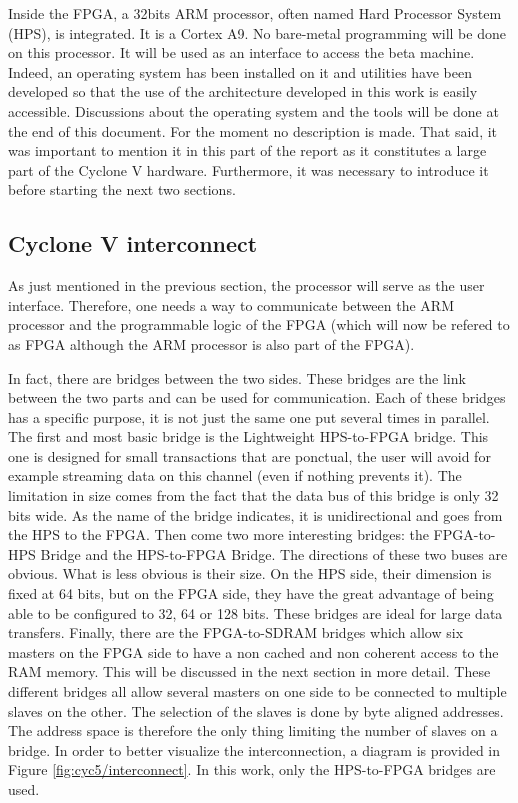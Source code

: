 Inside the FPGA, a 32bits ARM processor, often named Hard Processor System (HPS), is integrated. It is a Cortex A9. No bare-metal programming 
will be done on this processor. It will be used as an interface to access the beta machine. Indeed, 
an operating system has been installed on it and utilities have been developed so that the use of 
the architecture developed in this work is easily accessible. Discussions about the operating system 
and the tools will be done at the end of this document. For the moment no description is made. That 
said, it was important to mention it in this part of the report as it constitutes a large part of 
the Cyclone V hardware. Furthermore, it was necessary to introduce it before starting the next two 
sections.

\subsection{Cyclone V interconnect}

As just mentioned in the previous section, the processor will serve as the user interface. 
Therefore, one needs a way to communicate between the ARM processor and the programmable logic of the 
FPGA (which will now be refered to as FPGA although the ARM processor is also part of the FPGA). 

In fact, there are bridges between the two sides. These bridges are the link between the two parts 
and can be used for communication. Each of these bridges has a specific purpose, it is not just the 
same one put several times in parallel. The first and most basic bridge is the Lightweight HPS-to-FPGA 
bridge. This one is designed for small transactions that are ponctual, the user will avoid for example 
streaming data on this channel (even if nothing prevents it). The limitation in size comes from the 
fact that the data bus of this bridge is only 32 bits wide. As the name of the bridge indicates, it 
is unidirectional and goes from the HPS to the FPGA. Then come two more interesting bridges: the 
FPGA-to-HPS Bridge and the HPS-to-FPGA Bridge. The directions of these two buses are obvious. What 
is less obvious is their size. On the HPS side, their dimension is fixed at 64 bits, but on the FPGA 
side, they have the great advantage of being able to be configured to 32, 64 or 128 bits. 
These bridges are ideal for large data transfers. Finally, there are the FPGA-to-SDRAM bridges which 
allow six masters on the FPGA side to have a non cached and non coherent access to the RAM memory. 
This will be discussed in the next section in more detail. These different bridges all allow several
masters on one side to be connected to multiple slaves on the other. The selection of the 
slaves is done by byte aligned addresses. The address space is therefore the only thing limiting the 
number of slaves on a bridge. In order to better visualize the interconnection, a diagram is provided 
in Figure \ref{fig:cyc5/interconnect}. In this work, only the HPS-to-FPGA bridges are used.

